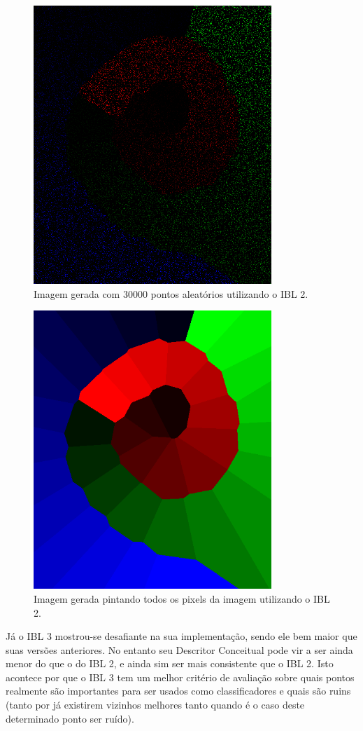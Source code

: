 \documentclass[12pt]{article}
\begin{document}
\begin{figure}[hb]
	\center
	\includegraphics[width=9cm]{./outputs/simple30000dots.png}
	\caption{Imagem gerada com 30000 pontos aleatórios utilizando o IBL 2.}
\end{figure}

\begin{figure}[hb]
	\center
	\includegraphics[width=9cm]{./outputs/sequentialsimple.png}
	\caption{Imagem gerada pintando todos os pixels da imagem utilizando o IBL 2.}
\end{figure}

Já o IBL 3 mostrou-se desafiante na sua implementação, sendo ele bem maior que suas versões anteriores. No entanto seu Descritor Conceitual pode vir a ser ainda menor do que o do IBL 2, e ainda sim ser mais consistente que o IBL 2. Isto acontece por que o IBL 3 tem um melhor critério de avaliação sobre quais pontos realmente são importantes para ser usados como classificadores e quais são ruins (tanto por já existirem vizinhos melhores tanto quando é o caso deste determinado ponto ser ruído).
\end{document}
